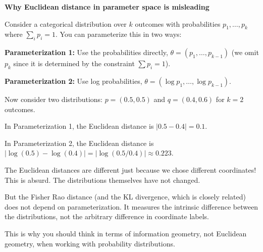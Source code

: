 \begin{examplebox}
\textbf{Why Euclidean distance in parameter space is misleading}

\vspace{0.5em}

Consider a categorical distribution over $k$ outcomes with probabilities $p_1, \ldots, p_k$ where $\sum_i p_i = 1$. You can parameterize this in two ways:

\vspace{0.5em}

\textbf{Parameterization 1:} Use the probabilities directly, $\theta = (p_1, \ldots, p_{k-1})$ (we omit $p_k$ since it is determined by the constraint $\sum p_i = 1$).

\vspace{0.5em}

\textbf{Parameterization 2:} Use log probabilities, $\theta = (\log p_1, \ldots, \log p_{k-1})$.

\vspace{0.5em}

Now consider two distributions: $p = (0.5, 0.5)$ and $q = (0.4, 0.6)$ for $k = 2$ outcomes.

\vspace{0.5em}

In Parameterization 1, the Euclidean distance is $|0.5 - 0.4| = 0.1$.

\vspace{0.5em}

In Parameterization 2, the Euclidean distance is $|\log(0.5) - \log(0.4)| = |\log(0.5/0.4)| \approx 0.223$.

\vspace{0.5em}

The Euclidean distances are different just because we chose different coordinates! This is absurd. The distributions themselves have not changed.

\vspace{0.5em}

But the Fisher Rao distance (and the KL divergence, which is closely related) does not depend on parameterization. It measures the intrinsic difference between the distributions, not the arbitrary difference in coordinate labels.

\vspace{0.5em}

This is why you should think in terms of information geometry, not Euclidean geometry, when working with probability distributions.
\end{examplebox}


